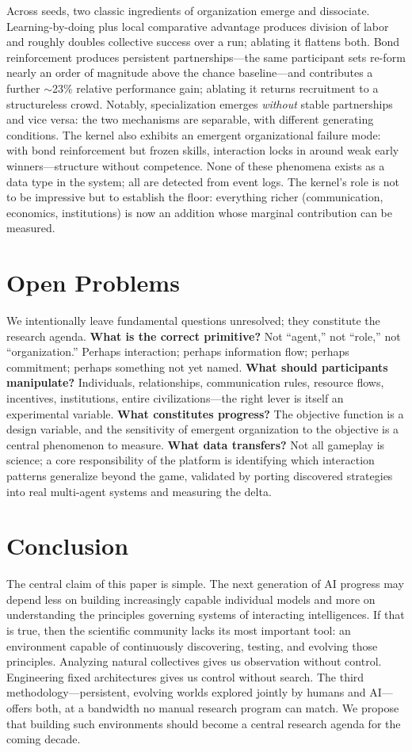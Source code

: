 \documentclass{article}
\begin{document}
Across seeds, two classic ingredients of organization emerge and dissociate. Learning-by-doing plus local comparative advantage produces division of labor and roughly doubles collective success over a run; ablating it flattens both. Bond reinforcement produces persistent partnerships---the same participant sets re-form nearly an order of magnitude above the chance baseline---and contributes a further $\sim$23\% relative performance gain; ablating it returns recruitment to a structureless crowd. Notably, specialization emerges \emph{without} stable partnerships and vice versa: the two mechanisms are separable, with different generating conditions. The kernel also exhibits an emergent organizational failure mode: with bond reinforcement but frozen skills, interaction locks in around weak early winners---structure without competence. None of these phenomena exists as a data type in the system; all are detected from event logs. The kernel's role is not to be impressive but to establish the floor: everything richer (communication, economics, institutions) is now an addition whose marginal contribution can be measured.

\section{Open Problems}

We intentionally leave fundamental questions unresolved; they constitute the research agenda. \textbf{What is the correct primitive?} Not ``agent,'' not ``role,'' not ``organization.'' Perhaps interaction; perhaps information flow; perhaps commitment; perhaps something not yet named. \textbf{What should participants manipulate?} Individuals, relationships, communication rules, resource flows, incentives, institutions, entire civilizations---the right lever is itself an experimental variable. \textbf{What constitutes progress?} The objective function is a design variable, and the sensitivity of emergent organization to the objective is a central phenomenon to measure. \textbf{What data transfers?} Not all gameplay is science; a core responsibility of the platform is identifying which interaction patterns generalize beyond the game, validated by porting discovered strategies into real multi-agent systems and measuring the delta.

\section{Conclusion}

The central claim of this paper is simple. The next generation of AI progress may depend less on building increasingly capable individual models and more on understanding the principles governing systems of interacting intelligences. If that is true, then the scientific community lacks its most important tool: an environment capable of continuously discovering, testing, and evolving those principles. Analyzing natural collectives gives us observation without control. Engineering fixed architectures gives us control without search. The third methodology---persistent, evolving worlds explored jointly by humans and AI---offers both, at a bandwidth no manual research program can match. We propose that building such environments should become a central research agenda for the coming decade.
\end{document}
